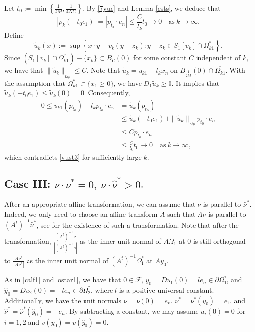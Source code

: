 \documentclass[11pt]{amsart}
\theoremstyle{plain}
\newcommand{\0}{\textbf{0}}
\numberwithin{equation}{section}
\numberwithin{equation}{section}
\numberwithin{figure}{section}
\begin{document}
Let \( t_0 := \min\left\{\frac{1}{4M}, \frac{1}{4NC}\right\} \). By \eqref{7yue} and Lemma \ref{ests}, we deduce that
\[
|\rho_k(-t_0e_1)| = |p_{t_0} \cdot e_n| \leq \frac{C}{l_k}t_0 \rightarrow 0 \quad \text{as} \ k \rightarrow \infty.
\]
Define
\[
\tilde{u}_k(x) := \sup\left\{ x \cdot y - v_k(y + z_k) : y + z_k \in S_1[v_k] \cap \Omega^*_{k1} \right\}.
\]
Since $\left(S_1[v_k] \cap \Omega^*_{k1}\right)-\{x_k\}\subset B_C(0)$ for some constant $C$ independent of $k,$ we have that $\|\tilde u_k\|_{_{Lip}}\leq C.$ 
Note that \( \tilde{u}_k = u_{k1} - l_kx_n \) on \( B_{\frac{1}{2M}}(0) \cap \overline{\Omega_{k1}} \). With the assumption that \( \Omega^*_{k1} \subset \{x_1 \geq 0\} \), we have \( D_1\tilde{u}_k \geq 0 \). It implies that \( \tilde{u}_k(-t_0e_1)\leq  \tilde{u}_k(0)=0\).
 Consequently,
\begin{align*}
0\leq u_{k1}(p_{t_0}) - l_kp_{t_0} \cdot e_n &= \tilde{u}_k(p_{t_0}) \\
&\leq \tilde{u}_k(-t_0e_1) + \|\tilde u_k\|_{_{Lip}}p_{t_0} \cdot e_n \\
&\leq Cp_{t_0} \cdot e_n \\
&\leq \frac{C}{l_k}t_0 \rightarrow 0 \quad \text{as} \ k \rightarrow \infty,
\end{align*}
which contradicts \eqref{vust3} for sufficiently large \( k \). 



\subsection{Case  \textbf{III}: $\nu\cdot \nu^*=0,\ \nu \cdot \hat\nu^* > 0$.}

After an appropriate affine transformation, we can assume that \(\nu\) is parallel to \(\hat{\nu}^*\). 
Indeed, we only need to choose an affine transform \( A \) such that \( A\nu \) is parallel to \( (A^t)^{-1}\hat{\nu}^* \),
see \cite[(3.2)]{CLW3} for the existence of such a transformation. Note that after the transformation, 
\(\frac{(A^t)^{-1}\nu}{|(A^t)^{-1}\nu|}\) as the inner unit normal of \( A\Omega_1 \) at \( 0 \) is still orthogonal to
\(\frac{A\nu^*}{|A\nu^*|}\) as the inner unit normal of \( (A^t)^{-1}\Omega_1^* \) at \( Ay_0 \).

As in \eqref{calf1} and \eqref{ostar1}, we have that \(0 \in \mathcal{F}\), \(y_0 = Du_1(0) = le_n \in \partial\Omega^*_1\), and \(\hat{y}_0 = Du_2(0) = -le_n \in \partial\Omega^*_2\), where \(l\) is a positive universal constant. 
Additionally, we have the unit normals \(\nu = \nu(0) = e_n\), \(\nu^* = \nu^*(y_0) = e_1\), and \(\hat{\nu}^* = \hat{\nu}^*(\hat{y}_0) = -e_n\). By subtracting a constant, we may assume \(u_i(0) = 0\) for \(i = 1, 2\) and \(v(y_0) = v(\hat{y}_0) = 0\).
\end{document}
